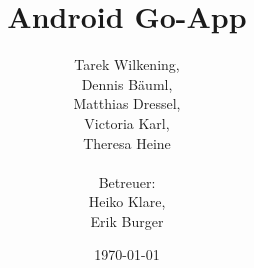 \documentclass[parskip=full]{scrartcl}
\begin{document}
\title{Android Go-App}
\author{Tarek Wilkening, \\Dennis Bäuml, \\Matthias Dressel, \\Victoria Karl, \\Theresa Heine\\
	\\Betreuer: \\Heiko Klare, \\ Erik Burger\\}
\date{\today}
\maketitle
\newpage
\tableofcontents
\newpage


\newpage

\newpage

\newpage

\newpage

\newpage

\newpage

\newpage

\newpage

\newpage

\newpage

\newpage

\newpage

\end{document}
